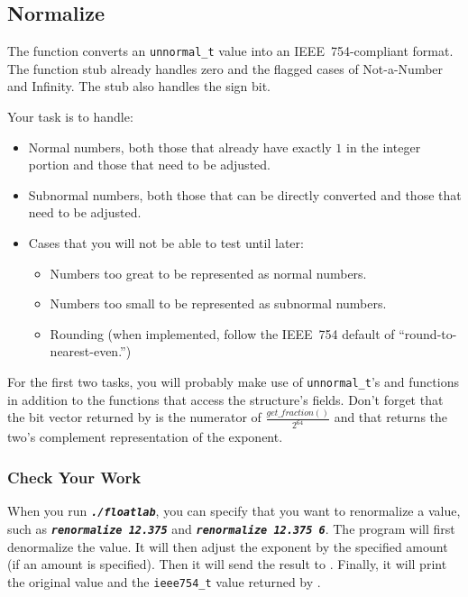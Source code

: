 \subsection*{Normalize}

The  function converts an \lstinline{unnormal_t} value into an IEEE~754-compliant format.
The function stub already handles zero and the flagged cases of Not-a-Number and Infinity.
The stub also handles the sign bit.

Your task is to handle:
\begin{itemize}
    \item Normal numbers, both those that already have exactly $1$ in the integer portion and those that need to be adjusted.
    \item Subnormal numbers, both those that can be directly converted and those that need to be adjusted.
    \item Cases that you will not be able to test until later:
    \begin{itemize}
        \item Numbers too great to be represented as normal numbers.
        \item Numbers too small to be represented as subnormal numbers.
        \item Rounding (when implemented, follow the IEEE~754 default of ``round-to-nearest-even.'')
    \end{itemize}
\end{itemize}

For the first two tasks, you will probably make use of \lstinline{unnormal_t}'s  and  functions in addition to the functions that access the structure's fields.
Don't forget that the bit vector returned by  is the numerator of $\frac{get\_fraction()}{2^{64}}$ and that  returns the two's complement representation of the exponent.

\subsubsection*{Check Your Work}

When you run \texttt{\textbf{\textit{./floatlab}}}, you can specify that you want to renormalize a value, such as \texttt{\textbf{\textit{renormalize 12.375}}} and \texttt{\textbf{\textit{renormalize 12.375 6}}}.
The program will first denormalize the value.
It will then adjust the exponent by the specified amount (if an amount is specified).
Then it will send the result to .
Finally, it will print the original value and the \lstinline{ieee754_t} value returned by .

